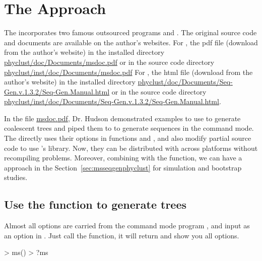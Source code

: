 \section[The ms+seqgen Approach]{The  Approach}
\label{sec:msseqgen}

The  incorporates two famous outsourced  programs
 \citep{Hudson2002} and  \citep{Rambaut1997}.
The original source code and documents are available on the author's
websites.
For ,
the pdf file (download from the author's website) in the installed directory
\url{phyclust/doc/Documents/msdoc.pdf} or in the source code directory
\url{phyclust/inst/doc/Documents/msdoc.pdf}
For ,
the html file (download from the author's website) in the installed directory
\url{phyclust/doc/Documents/Seq-Gen.v.1.3.2/Seq-Gen.Manual.html}
or in the source code directory
\url{phyclust/inst/doc/Documents/Seq-Gen.v.1.3.2/Seq-Gen.Manual.html}.

In the file \url{msdoc.pdf}, Dr. Hudson demonstrated examples to use 
to generate coalescent trees and piped them to  to generate
sequences in the command mode.
The  directly uses their options
in  functions  and , and also modify
partial source code to use 's library. Now, they can be
distributed with  across platforms without recompiling problems.
Moreover, combining with the  function, we can have a
 approach in the
Section~\ref{sec:msseqgenphyclust} for simulation and bootstrap studies.




\subsection[Use the ms() function to generate trees]{Use the  function to generate trees}
\label{sec:ms}

Almost all options are carried from the command mode program ,
and input as an option  in .
Just call the function, it will return and show you all options.
\begin{Code}
> ms()
> ?ms
\end{Code}

